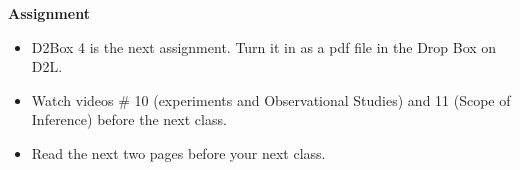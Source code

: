   
\noindent
{\bf Assignment} \vspace{-.2in}
\begin{itemize}
\item D2Box 4 is the next assignment.
    Turn it in as a pdf file in the Drop Box on D2L.
 \item Watch videos \# 10 (experiments and Observational Studies) and
   11 (Scope of Inference)  before the next class. 
\item Read the next two pages before your next class.
\end{itemize}




